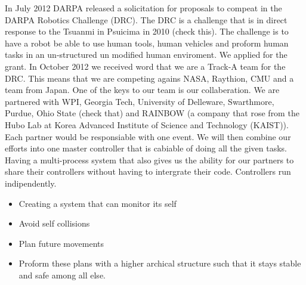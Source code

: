 In July 2012 DARPA released a solicitation for proposals to compeat in the DARPA Robotics Challenge (DRC).
The DRC is a challenge that is in direct response to the Tsuanmi in Psuicima in 2010 (check this).
The challenge is to have a robot be able to use human tools, human vehicles and proform human tasks in an un-structured un modified human enviroment.
We applied for the grant.
In October 2012 we received word that we are a Track-A team for the DRC.
This means that we are competing agains NASA, Raythion, CMU and a team from Japan.
One of the keys to our team is our collaberation.
We are partnered with WPI, Georgia Tech, University of Delleware, Swarthmore, Purdue, Ohio State (check that) and RAINBOW (a company that rose from the Hubo Lab at Korea Advanced Institute of Science and Technology (KAIST)).
Each partner would be responsiable with one event.
We will then combine our efforts into one master controller that is cabiable of doing all the given tasks.
Having a multi-process system that also gives us the ability for our partners to share their controllers without having to intergrate their code.  
Controllers run indipendently.





\begin{itemize}
\item Creating a system that can monitor its self
\item Avoid self collisions
\item Plan future movements
\item Proform these plans with a higher archical structure such that it stays stable and safe among all else.
\end{itemize}
